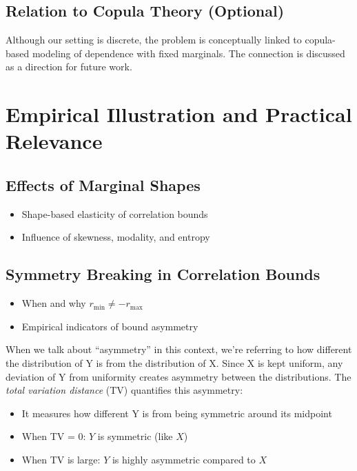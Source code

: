 \documentclass[
  12pt,
]{article}
\providecommand{\tightlist}{%
  \setlength{\itemsep}{0pt}\setlength{\parskip}{0pt}}\usepackage{longtable,booktabs,array}
\begin{document}
\subsection{Relation to Copula Theory
(Optional)}\label{relation-to-copula-theory-optional}

Although our setting is discrete, the problem is conceptually linked to
copula-based modeling of dependence with fixed marginals. The connection
is discussed as a direction for future work.

\section{Empirical Illustration and Practical
Relevance}\label{empirical-illustration-and-practical-relevance}

\subsection{Effects of Marginal
Shapes}\label{effects-of-marginal-shapes}

\begin{itemize}
\tightlist
\item
  Shape-based elasticity of correlation bounds\\
\item
  Influence of skewness, modality, and entropy
\end{itemize}

\subsection{Symmetry Breaking in Correlation
Bounds}\label{symmetry-breaking-in-correlation-bounds}

\begin{itemize}
\tightlist
\item
  When and why \(r_{\min} \neq -r_{\max}\)
\item
  Empirical indicators of bound asymmetry
\end{itemize}

When we talk about ``asymmetry'' in this context, we're referring to how
different the distribution of Y is from the distribution of X. Since X
is kept uniform, any deviation of Y from uniformity creates asymmetry
between the distributions. The \emph{total variation distance} (TV)
quantifies this asymmetry:

\begin{itemize}
\tightlist
\item
  It measures how different Y is from being symmetric around its
  midpoint
\item
  When TV = 0: \(Y\) is symmetric (like \(X\))
\item
  When TV is large: \(Y\) is highly asymmetric compared to \(X\)
\end{itemize}
\end{document}
